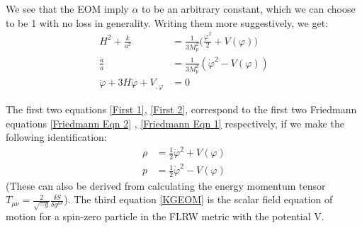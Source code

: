 \documentclass[aps,prd,reprint,preprintnumbers,showpacs,floatfix,nofootinbib,superscript address]{revtex4-2}
\begin{document}
We see that the EOM imply $\alpha$ to be an arbitrary constant, which we can choose to be 1 with no loss in generality. Writing them more suggestively, we get:
\begin{align}
    H^2 + \frac{k}{a^2} &= \frac{1}{3M_p^2} \bigg( \frac{\dot{\varphi}^2}{2} + V(\varphi) \bigg) \label{First 1} \\
    \frac{ \ddot{a}}{a}  &=  \frac{1}{3M_p^2}\left(\dot{\varphi}^2 - V(\varphi) \right) \label{First 2} \\
    \ddot{\varphi} + 3H\dot{\varphi} + V_{,\varphi} &= 0    \label{KGEOM}
\end{align}

The first two equations \ref{First 1}, \ref{First 2}, correspond to the first two Friedmann equations \ref{Friedmann Eqn 2} , \ref{Friedmann Eqn 1} respectively, if we make the following identification:
\begin{align}   \label{presure and density}
    \rho &= \frac{1}{2} \dot{\varphi}^2 + V(\varphi) \nonumber \\
    p &= \frac{1}{2} \dot{\varphi}^2 - V(\varphi)
\end{align}
(These can also be derived from calculating the energy momentum tensor $T_{\mu\nu} = \frac{2}{\sqrt{-g}} \frac{\delta S}{\delta  g^{\mu \nu}}$).
The third equation \ref{KGEOM} is the scalar field equation of motion for a spin-zero particle in the FLRW metric with the potential V. 

\end{document}
